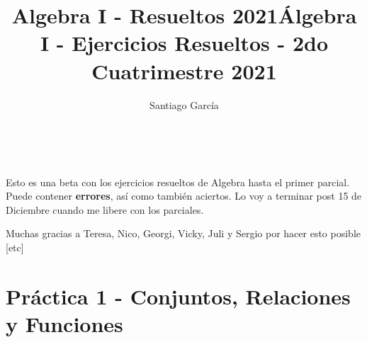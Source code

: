 \documentclass[a4paper,11pt]{article}
\title{Algebra I - Resueltos 2021}
\begin{document}
\makeatletter
\renewcommand{\maketitle}{
\begin{center}
\begin{normalsize}\textbf{\@title}\end{normalsize}\\
\begin{normalsize}\@author\end{normalsize}
\end{center}
}
\title{Álgebra I - Ejercicios Resueltos - 2do Cuatrimestre 2021} 
\author{Santiago García}
\maketitle

Esto es una beta con los ejercicios resueltos de Algebra hasta el primer parcial. Puede contener \textbf{errores}, así como también aciertos. Lo voy a terminar post 15 de Diciembre cuando me libere con los parciales. 

Muchas gracias a Teresa, Nico, Georgi, Vicky, Juli y Sergio por hacer esto posible [etc]

\section{Práctica 1 - Conjuntos, Relaciones y Funciones}
\end{document}
